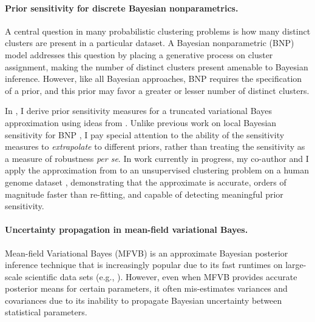\paragraph{Prior sensitivity for discrete Bayesian nonparametrics.}

A central question in many probabilistic clustering problems is how many
distinct clusters are present in a particular dataset. A Bayesian nonparametric
(BNP) model addresses this question by placing a generative process on cluster
assignment, making the number of distinct clusters present amenable to Bayesian
inference.  However, like all Bayesian approaches, BNP requires the
specification of a prior, and this prior may favor a greater or lesser number of
distinct clusters.

In \citep{giordano:2018:bnpsensitivity}, I derive prior sensitivity measures for
a truncated variational Bayes approximation using ideas from \citep{gustafson:1996:localposterior,
giordano:2018:covariances}. Unlike previous work on local Bayesian sensitivity
for BNP \citep{Basu:2000:BNP_robustness}, I pay special attention to the
ability of the sensitivity measures to \emph{extrapolate} to different priors,
rather than treating the sensitivity as a measure of robustness \textit{per se}.
In work currently in progress, my co-author and I apply the approximation from
\citep{giordano:2018:bnpsensitivity} to an unsupervised clustering problem on a
human genome dataset \citep{huang:2011:haplotype, raj:2014:faststructure},
demonstrating that the approximate is accurate, orders of magnitude faster than
re-fitting, and capable of detecting meaningful prior sensitivity.


\paragraph{Uncertainty propagation in mean-field variational Bayes.}

Mean-field Variational Bayes (MFVB) is an approximate Bayesian posterior
inference technique that is increasingly popular due to its fast runtimes on
large-scale scientific data sets (e.g., \citet{raj:2014:faststructure,
kucukelbir:2017:advi, regier:2019:cataloging}). However, even when MFVB provides
accurate posterior means for certain parameters, it often mis-estimates
variances and covariances \citep{wang:2005:inadequacy, turner:2011:two} due to
its inability to propagate Bayesian uncertainty between statistical parameters.

